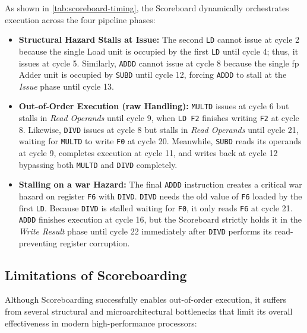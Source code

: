 As shown in \cref{tab:scoreboard-timing}, the Scoreboard dynamically orchestrates execution across the four pipeline phases:

\begin{itemize}
    \item \textbf{Structural Hazard Stalls at Issue:} The second \texttt{LD} cannot issue at cycle 2 because the single Load unit is occupied by the first \texttt{LD} until cycle 4; thus, it issues at cycle 5. Similarly, \texttt{ADDD} cannot issue at cycle 8 because the single \gls{fp} Adder unit is occupied by \texttt{SUBD} until cycle 12, forcing \texttt{ADDD} to stall at the \textit{Issue} phase until cycle 13.
    \item \textbf{Out-of-Order Execution (\gls{raw} Handling):} \texttt{MULTD} issues at cycle 6 but stalls in \textit{Read Operands} until cycle 9, when \texttt{LD F2} finishes writing \texttt{F2} at cycle 8. Likewise, \texttt{DIVD} issues at cycle 8 but stalls in \textit{Read Operands} until cycle 21, waiting for \texttt{MULTD} to write \texttt{F0} at cycle 20. Meanwhile, \texttt{SUBD} reads its operands at cycle 9, completes execution at cycle 11, and writes back at cycle 12 bypassing both \texttt{MULTD} and \texttt{DIVD} completely.
    \item \textbf{Stalling on a \gls{war} Hazard:} The final \texttt{ADDD} instruction creates a critical \gls{war} hazard on register \texttt{F6} with \texttt{DIVD}. \texttt{DIVD} needs the old value of \texttt{F6} loaded by the first \texttt{LD}. Because \texttt{DIVD} is stalled waiting for \texttt{F0}, it only reads \texttt{F6} at cycle 21. \texttt{ADDD} finishes execution at cycle 16, but the Scoreboard strictly holds it in the \textit{Write Result} phase until cycle 22 immediately after \texttt{DIVD} performs its read-preventing register corruption.
\end{itemize}

\subsection{Limitations of Scoreboarding}

Although Scoreboarding successfully enables out-of-order execution, it suffers from several structural and microarchitectural bottlenecks that limit its overall effectiveness in modern high-performance processors:

